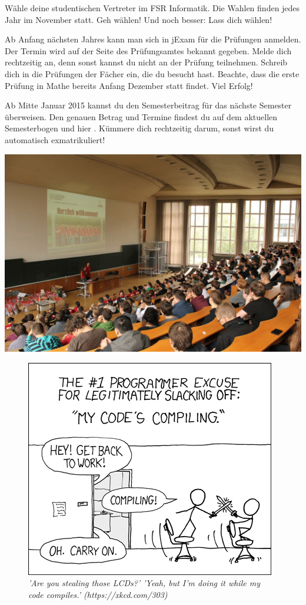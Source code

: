 \begin{itemize}[leftmargin=*]
Wähle deine studentischen Vertreter im FSR Informatik.
Die Wahlen finden jedes Jahr im November statt.
Geh wählen!
Und noch besser: Lass dich wählen!

Ab Anfang nächsten Jahres kann man sich in jExam für die Prüfungen anmelden. Der Termin wird auf der Seite des Prüfungsamtes bekannt gegeben. Melde dich rechtzeitig an, denn sonst kannst du nicht an der Prüfung teilnehmen.
Schreib dich in die Prüfungen der Fächer ein, die du besucht hast.
Beachte, dass die erste Prüfung in Mathe bereits Anfang Dezember statt findet.
Viel Erfolg!

Ab Mitte Januar 2015 kannst du den Semesterbeitrag für das nächste Semester überweisen. 
Den genauen Betrag und Termine findest du auf dem aktuellen Semesterbogen und hier .
Kümmere dich rechtzeitig darum, sonst wirst du automatisch exmatrikuliert!

\end{itemize}

\vfill

\includegraphics[width=\linewidth]{img/ese2013/barschoe.jpg}

\vfill

\begin{figure}[h!]
\centering
\includegraphics[scale=.5]{img/xkcd/compiling.png}
\caption*{{\small \textit{'Are you stealing those LCDs?' 'Yeah, but I'm doing it while my code compiles.' (https://xkcd.com/303)}}}
\end{figure}
